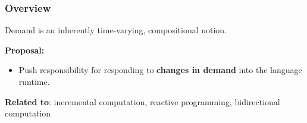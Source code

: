 \begin{frame}
\frametitle{Overview}

Demand is an inherently time-varying, compositional notion.

\vspace{7pt}
\pause
\textbf{Proposal:}
\begin{itemize}
\item Push responsibility for responding to \textbf{changes in demand}
  into the language runtime.
\end{itemize}
\vspace{5pt}
\pause \textbf{Related to}: incremental computation, reactive programming, bidirectional computation
\end{frame}
